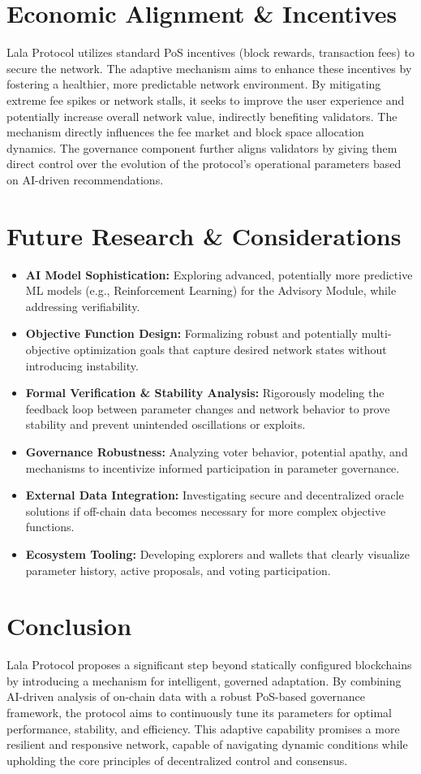 \documentclass[11pt]{article}
\begin{document}
\section{Economic Alignment \& Incentives}
Lala Protocol utilizes standard PoS incentives (block rewards, transaction fees) to secure the network. The adaptive mechanism aims to enhance these incentives by fostering a healthier, more predictable network environment. By mitigating extreme fee spikes or network stalls, it seeks to improve the user experience and potentially increase overall network value, indirectly benefiting validators. The mechanism directly influences the fee market and block space allocation dynamics. The governance component further aligns validators by giving them direct control over the evolution of the protocol's operational parameters based on AI-driven recommendations.

\section{Future Research \& Considerations}
\begin{itemize}
    \item \textbf{AI Model Sophistication:} Exploring advanced, potentially more predictive ML models (e.g., Reinforcement Learning) for the Advisory Module, while addressing verifiability.
    \item \textbf{Objective Function Design:} Formalizing robust and potentially multi-objective optimization goals that capture desired network states without introducing instability.
    \item \textbf{Formal Verification \& Stability Analysis:} Rigorously modeling the feedback loop between parameter changes and network behavior to prove stability and prevent unintended oscillations or exploits.
    \item \textbf{Governance Robustness:} Analyzing voter behavior, potential apathy, and mechanisms to incentivize informed participation in parameter governance.
    \item \textbf{External Data Integration:} Investigating secure and decentralized oracle solutions if off-chain data becomes necessary for more complex objective functions.
    \item \textbf{Ecosystem Tooling:} Developing explorers and wallets that clearly visualize parameter history, active proposals, and voting participation.
\end{itemize}

\section{Conclusion}
Lala Protocol proposes a significant step beyond statically configured blockchains by introducing a mechanism for intelligent, governed adaptation. By combining AI-driven analysis of on-chain data with a robust PoS-based governance framework, the protocol aims to continuously tune its parameters for optimal performance, stability, and efficiency. This adaptive capability promises a more resilient and responsive network, capable of navigating dynamic conditions while upholding the core principles of decentralized control and consensus.
\end{document}
